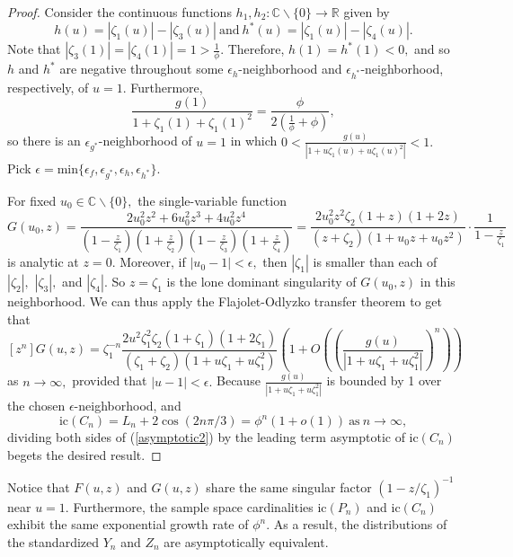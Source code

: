 \documentclass[11pt, reqno]{amsart}
\theoremstyle{definition}
\begin{document}
\begin{proof}
Consider the continuous functions $h_1, h_2 : \mathbb{C}\backslash\{0\} \rightarrow \mathbb{R}$ given by
\[h(u) = |\zeta_1(u)| - |\zeta_3(u)|\ \text{and}\ h^*(u) = |\zeta_1(u)| - |\zeta_4(u)|.\]
Note that $|\zeta_3(1)| = |\zeta_4(1)| = 1 > \frac{1}{\phi}.$ Therefore, $h(1) = h^*(1) < 0,$ and so $h$ and $h^*$ are negative throughout some $\epsilon_h$-neighborhood and $\epsilon_{h^*}$-neighborhood, respectively, of $u = 1.$ Furthermore,
\begin{equation}
\frac{g(1)}{1+\zeta_1(1)+\zeta_1(1)^2} = \frac{\phi}{2(\frac{1}{\phi}+\phi)},
\end{equation}
so there is an $\epsilon_{g^*}$-neighborhood of $u = 1$ in which $0 < \frac{g(u)}{|1+u\zeta_1(u)+u\zeta_1(u)^2|}<1.$ Pick $\epsilon = \text{min}\{\epsilon_f, \epsilon_{g^*}, \epsilon_h, \epsilon_{h^*}\}.$

For fixed $u_0 \in \mathbb{C}\backslash\{0\},$ the single-variable function
\[G(u_0, z) = \frac{2u_0^2z^2+6u_0^2z^3+4u_0^2z^4}{(1 - \frac{z}{\zeta_1})(1 + \frac{z}{\zeta_2})(1 - \frac{z}{\zeta_3})(1 + \frac{z}{\zeta_4})} = \frac{2u_0^2z^2\zeta_2(1+z)(1+2z)}{(z+\zeta_2)(1+u_0z+u_0z^2)}\cdot\frac{1}{1-\frac{z}{\zeta_1}}\]
is analytic at $z = 0.$ Moreover, if $|u_0 - 1| < \epsilon,$ then $|\zeta_1|$ is smaller than each of $|\zeta_2|,$ $|\zeta_3|,$ and $|\zeta_4|.$ So $z = \zeta_1$ is the lone dominant singularity of $G(u_0, z)$ in this neighborhood. We can thus apply the Flajolet-Odlyzko transfer theorem to get that
\begin{equation}
\label{asymptotic2}
[z^n]G(u,z) = \zeta_1^{-n}\frac{2u^2\zeta_1^2\zeta_2(1+\zeta_1)(1+2\zeta_1)}{(\zeta_1+\zeta_2)(1+u\zeta_1+u\zeta_1^2)}\left(1+O\left(\left(\frac{g(u)}{|1+u\zeta_1+u\zeta_1^2|}\right)^n\right)\right)
\end{equation}
as $n \to \infty,$ provided that $|u - 1| < \epsilon.$ Because $\frac{g(u)}{|1+u\zeta_1+u\zeta_1^2|}$ is bounded by 1 over the chosen $\epsilon$-neighborhood, and
\begin{equation}
\text{ic}(C_n) = L_n + 2\cos(2n\pi/3) = \phi^n(1 + o(1))\ \text{as}\ n \to \infty,
\end{equation}
dividing both sides of (\ref{asymptotic2}) by the leading term asymptotic of $\text{ic}(C_n)$ begets the desired result.
\end{proof}

Notice that $F(u,z)$ and $G(u,z)$ share the same singular factor $(1 - z/\zeta_1)^{-1}$ near $u=1.$ Furthermore, the sample space cardinalities $\text{ic}(P_n)$ and $\text{ic}(C_n)$ exhibit the same exponential growth rate of $\phi^n.$ As a result, the distributions of the standardized $Y_n$ and $Z_n$ are asymptotically equivalent.
\end{document}
